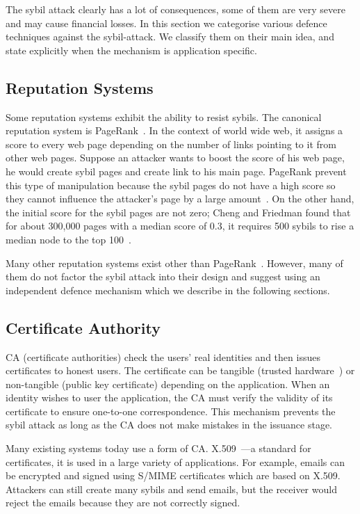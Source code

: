 The sybil attack clearly has a lot of consequences, some of them are very severe
and may cause financial losses. In this section we categorise various defence
techniques against the sybil-attack. We classify them on their main idea, and
state explicitly when the mechanism is application specific.

\subsection{Reputation Systems}
Some reputation systems exhibit the ability to resist sybils. The canonical
reputation system is PageRank~\cite{page1999pagerank}. In the context of world
wide web, it assigns a score to every web page depending on the number of links
pointing to it from other web pages. Suppose an attacker wants to boost the
score of his web page, he would create sybil pages and create link to his main
page. PageRank prevent this type of manipulation because the sybil pages do not
have a high score so they cannot influence the attacker's page by a large
amount~\cite{baeza2005pagerank}. On the other hand, the initial score for the
sybil pages are not zero; Cheng and Friedman found that for about 300,000 pages
with a median score of 0.3, it requires 500 sybils to rise a median node to the
top 100~\cite{cheng2006manipulability}.

Many other reputation systems exist other than
PageRank~\cite{kamvar2003eigentrust, srivatsa2005trustguard,
  nandi2005scrivener}. However, many of them do not factor the sybil attack into
their design and suggest using an independent defence mechanism which we
describe in the following sections.

\subsection{Certificate Authority}\label{sec:cert-authority}
CA (certificate authorities) check the users' real identities and then issues
certificates to honest users. The certificate can be tangible (trusted
hardware~\cite{newsome2004sybil}) or non-tangible (public key certificate)
depending on the application. When an identity wishes to user the application,
the CA must verify the validity of its certificate to ensure one-to-one
correspondence. This mechanism prevents the sybil attack as long as the CA does
not make mistakes in the issuance stage.

Many existing systems today use a form of CA.
X.509~\cite{housley2002internet}---a standard for certificates, it is used in a
large variety of applications. For example, emails can be encrypted and signed
using S/MIME\cite{ramsdell2010secure} certificates which are based on X.509.
Attackers can still create many sybils and send emails, but the receiver would
reject the emails because they are not correctly signed.

